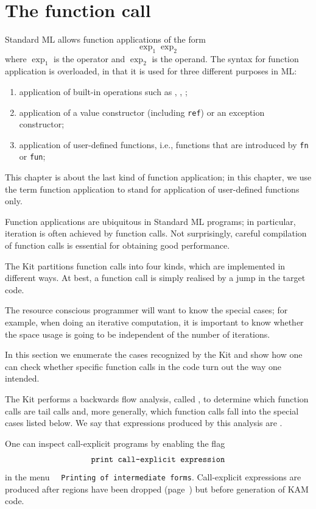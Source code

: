 \documentclass[12pt]{book}
\begin{document}
\chapter{The function call}
Standard ML allows function applications of the form
$$\exp_1 \exp_2$$
where $\exp_1$ is the operator and $\exp_2$ is the operand.
The syntax for  function application is overloaded, in that it is used
for  three different purposes in ML:
\begin{enumerate}
\item application of built-in operations such as \boxml{+}, \boxml{=}, \boxml{:=};
\item application of a value constructor (including {\tt ref}) or an exception constructor;
\item application of user-defined functions, i.e., functions that
are introduced by {\tt fn} or {\tt fun};
\end{enumerate}
This chapter is about the last kind of function application; in this chapter,
we use the term function application to stand for application of user-defined functions
only.

Function applications are ubiquitous in Standard ML programs; in particular, iteration
is often achieved by function calls. Not surprisingly, careful compilation of 
function calls is essential for obtaining
good performance. 

The Kit partitions function calls into four kinds, which are implemented in different ways.
At best, a function call is simply realised by a jump in the target code. 

The resource conscious programmer will want to know the special cases; for example,
when doing an iterative computation, it is important to know whether the space usage
is going to be independent of the number of iterations. 

In this section we enumerate the cases recognized by the Kit and show how one can
check whether specific function calls in the code turn out the way one intended.

The Kit performs a backwards flow analysis, called ,
to determine which function calls are tail calls and, more generally, which function calls fall
into the special cases listed below. We say that expressions produced
by this analysis are .\label{call-explicit}

One can inspect call-explicit programs by enabling the flag 
$$\hbox{\tt print call-explicit expression}$$
in the menu~~ \texttt{Printing of intermediate forms}.
Call-explicit expressions are produced after regions have been dropped
(page~\pageref{bother-to-distinguish-get-n-put}) but before generation of KAM code.
\end{document}
